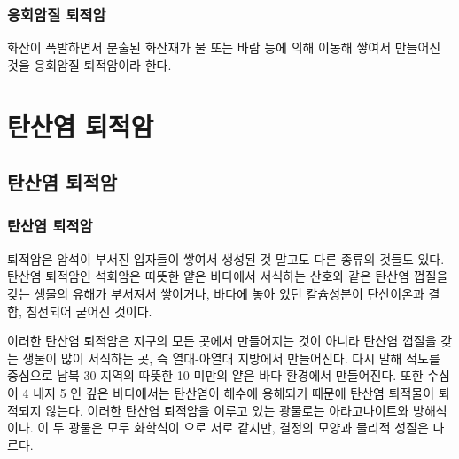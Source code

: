 \documentclass[12pt, a4paper, twoside]{book}
\begin{document}
		\subsection{응회암질 퇴적암}

				화산이 폭발하면서 분출된 화산재가 물 또는 바람 등에 의해 이동해 쌓여서 만들어진 것을 응회암질 퇴적암이라 한다.



	
	
	
	
	
	
	
	
	
	\clearpage
	\chapter{탄산염 퇴적암}
	\minitoc				%
	
	
	\clearpage
	\section{탄산염 퇴적암}
	
	
	
	
		\subsection{탄산염 퇴적암}

				퇴적암은 암석이 부서진 입자들이 쌓여서 생성된 것 말고도 다른 종류의 것들도 있다. 
				탄산염 퇴적암인 석회암은 따뜻한 얕은 바다에서 서식하는 산호와 같은 탄산염 껍질을 갖는 생물의 유해가 부서져서 쌓이거나, 바다에 놓아 있던 칼슘성분이 탄산이온과 결합, 침전되어 굳어진 것이다.

				이러한 탄산염 퇴적암은 지구의 모든 곳에서 만들어지는 것이 아니라 탄산염 껍질을 갖는 생물이 많이 서식하는 곳, 즉 열대-아열대 지방에서 만들어진다. 
				다시 말해 적도를 중심으로 남북 30 지역의 따뜻한 10  미만의 얕은 바다 환경에서 만들어진다. 
				또한 수심이 4 내지 5 인 깊은 바다에서는 탄산염이 해수에 용해되기 때문에 탄산염 퇴적물이 퇴적되지 않는다. 
				이러한 탄산염 퇴적암을 이루고 있는 광물로는 아라고나이트와 방해석이다. 
				이 두 광물은 모두 화학식이 으로 서로 같지만, 결정의 모양과 물리적 성질은 다르다.



	
	
\end{document}
